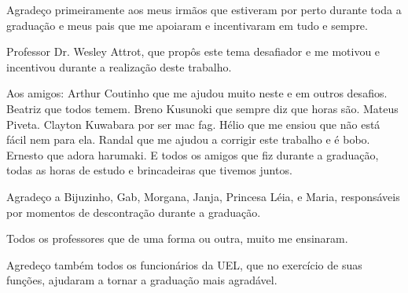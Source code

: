 \begin{agradecimentos}
Agradeço primeiramente aos meus irmãos que estiveram por perto durante toda
a graduação e meus pais que me apoiaram e incentivaram 
em tudo e sempre.
        
Professor Dr. Wesley Attrot, que propôs este tema desafiador e me motivou e 
incentivou durante a realização deste trabalho.

Aos amigos: 
Arthur Coutinho que me ajudou muito neste e em outros desafios. 
Beatriz que todos temem. 
Breno Kusunoki que sempre diz que horas são.
Mateus Piveta. 
Clayton Kuwabara por ser mac fag. 
Hélio que me ensiou que não está fácil nem para ela. 
Randal que me ajudou a corrigir este trabalho e é bobo. 
Ernesto que adora harumaki.
E todos os amigos que fiz durante a graduação, todas as horas de estudo
e brincadeiras que tivemos juntos.

Agradeço a Bijuzinho, Gab, Morgana, Janja, Princesa Léia, e Maria, responsáveis
por momentos de descontração durante a graduação.

Todos os professores que de uma forma ou outra, muito me ensinaram.

Agredeço também todos os funcionários da UEL, que no exercício de suas funções,
ajudaram a tornar a graduação mais agradável.
\end{agradecimentos}
